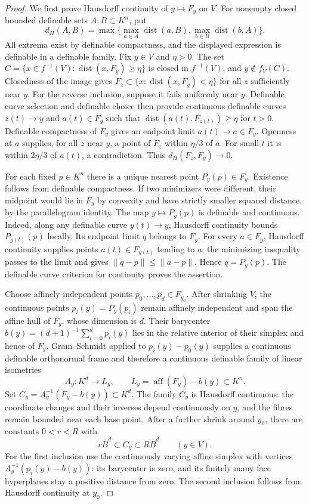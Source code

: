 \begin{proof}
We first prove Hausdorff continuity of $y\mapsto F_y$ on $V$.
For nonempty closed bounded definable sets $A,B\subset K^n$, put
\[
 d_H(A,B)=\max\{\max_{a\in A}\operatorname{dist}(a,B),
                         \max_{b\in B}\operatorname{dist}(b,A)\}.
\]
All extrema exist by definable compactness, and the displayed expression
is definable in a definable family. Fix $y\in V$ and $\eta>0$.
The set $C=\{x\in f^{-1}(V):\operatorname{dist}(x,F_y)\geq\eta\}$
is closed in $f^{-1}(V)$, and $y\notin f_V(C)$. Closedness of the image
gives $F_z\subset\{x:\operatorname{dist}(x,F_y)<\eta\}$ for all $z$
sufficiently near $y$.
For the reverse inclusion, suppose it fails uniformly near $y$.
Definable curve selection and definable choice then provide continuous
definable curves $z(t)\to y$ and $a(t)\in F_y$ such that
$\operatorname{dist}(a(t),F_{z(t)})\geq\eta$ for $t>0$.
Definable compactness of $F_y$ gives an endpoint limit $a(t)\to a\in F_y$.
Openness at $a$ supplies, for all $z$ near $y$, a point of $F_z$ within
$\eta/3$ of $a$. For small $t$ it is within $2\eta/3$ of $a(t)$,
a contradiction. Thus $d_H(F_z,F_y)\to0$.

For each fixed $p\in K^n$ there is a unique nearest point
$P_y(p)\in F_y$. Existence follows from definable compactness. If two
minimizers were different, their midpoint would lie in $F_y$ by convexity
and have strictly smaller squared distance, by the parallelogram
identity. The map $y\mapsto P_y(p)$ is definable and continuous.
Indeed, along any definable curve $y(t)\to y$, Hausdorff continuity
bounds $P_{y(t)}(p)$ locally. Its endpoint limit $q$ belongs to $F_y$.
For every $a\in F_y$, Hausdorff continuity supplies points
$a(t)\in F_{y(t)}$ tending to $a$; the minimizing inequality passes
to the limit and gives $\|q-p\|\leq\|a-p\|$. Hence $q=P_y(p)$.
The definable curve criterion for continuity proves the assertion.

Choose affinely independent points $p_0,\ldots,p_d\in F_{y_0}$.
After shrinking $V$, the continuous points $p_i(y)=P_y(p_i)$ remain
affinely independent and span the affine hull of $F_y$, whose dimension
is $d$. Their barycenter
$b(y)=(d+1)^{-1}\sum_{i=0}^d p_i(y)$ lies in the relative interior
of their simplex and hence of $F_y$. Gram--Schmidt applied to
$p_i(y)-p_0(y)$ supplies a continuous definable orthonormal frame and
therefore a continuous definable family of linear isometries
\[
 A_y:K^d\longrightarrow L_y,
 \qquad L_y=\operatorname{aff}(F_y)-b(y)\subset K^n.
\]
Set $C_y=A_y^{-1}(F_y-b(y))\subset K^d$. The family $C_y$ is
Hausdorff continuous: the coordinate changes and their inverses depend
continuously on $y$, and the fibres remain bounded near each base point.
After a further shrink around $y_0$, there are constants $0<r<R$ with
\[
              r\overline B^d\subset C_y\subset R\overline B^d
                    \qquad(y\in V).                              \tag{A5.13.3}
\]
For the first inclusion use the continuously varying affine simplex
with vertices $A_y^{-1}(p_i(y)-b(y))$: its barycenter is zero, and its
finitely many face hyperplanes stay a positive distance from zero.
The second inclusion follows from Hausdorff continuity at $y_0$.


\end{proof}
